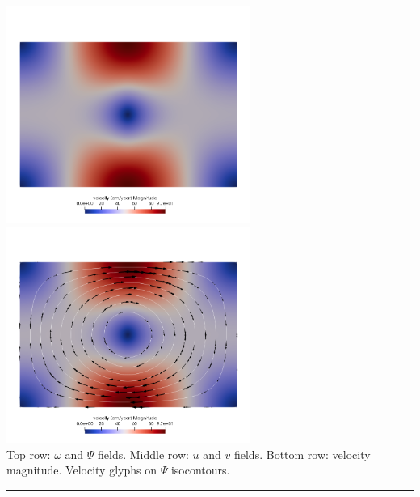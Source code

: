\begin{center}
\includegraphics[width=8cm]{python_codes/fieldstone_153/results/exp2/vel}
\includegraphics[width=8cm]{python_codes/fieldstone_153/results/exp2/vel2}\\
{\captionfont Top row: $\omega$ and $\Psi$ fields.
Middle row: $u$ and $v$ fields. 
Bottom row: velocity magnitude. Velocity glyphs on $\Psi$ isocontours.}
\end{center}










\par\noindent\rule{\textwidth}{0.4pt}

\vspace{.5cm}

\begin{center}
\end{center}



